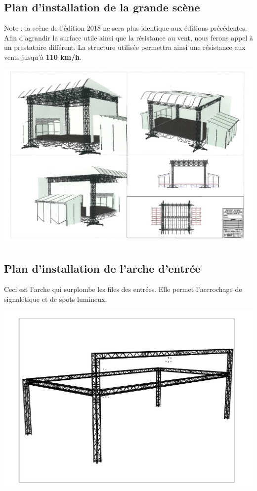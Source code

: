 \documentclass[hidelinks, paper=a4, fontsize=13pt]{report}
\begin{document}
\subsection{Plan d'installation de la grande scène}
Note : la scène de l’édition 2018 ne sera plus identique aux éditions précédentes. Afin d'agrandir la surface utile ainsi que la résistance au vent, nous ferons appel à un prestataire différent. La structure utilisée permettra ainsi une résistance aux vents jusqu'à \textbf{110 km/h}.
\begin{center}
	\includegraphics[scale=0.40, angle=90]{Annexes/Images/GrandeScene}
\end{center}

\subsection{Plan d’installation de l'arche d’entrée}
Ceci est l'arche qui surplombe les files des entrées. Elle permet l'accrochage de signalétique et de spots lumineux.
\begin{center}
	\includegraphics[scale=0.6, angle=90]{Annexes/Images/ArcheEntrees}
\end{center}
\end{document}
